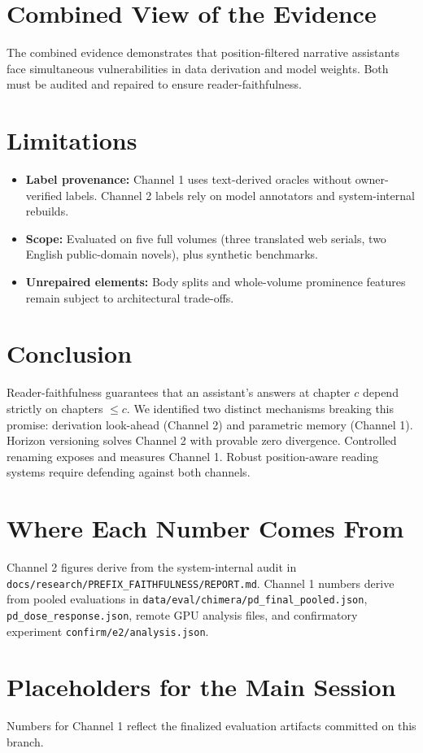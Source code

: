 \documentclass[11pt]{article}
\begin{document}
\section{Combined View of the Evidence}

The combined evidence demonstrates that position-filtered narrative assistants face simultaneous vulnerabilities in data derivation and model weights. Both must be audited and repaired to ensure reader-faithfulness.

\section{Limitations}

\begin{itemize}
    \item \textbf{Label provenance:} Channel 1 uses text-derived oracles without owner-verified labels. Channel 2 labels rely on model annotators and system-internal rebuilds.
    \item \textbf{Scope:} Evaluated on five full volumes (three translated web serials, two English public-domain novels), plus synthetic benchmarks.
    \item \textbf{Unrepaired elements:} Body splits and whole-volume prominence features remain subject to architectural trade-offs.
\end{itemize}

\section{Conclusion}

Reader-faithfulness guarantees that an assistant's answers at chapter $c$ depend strictly on chapters $\le c$. We identified two distinct mechanisms breaking this promise: derivation look-ahead (Channel 2) and parametric memory (Channel 1). Horizon versioning solves Channel 2 with provable zero divergence. Controlled renaming exposes and measures Channel 1. Robust position-aware reading systems require defending against both channels.

\appendix

\section{Where Each Number Comes From}
Channel 2 figures derive from the system-internal audit in \texttt{docs/research/PREFIX\_FAITHFULNESS/REPORT.md}. Channel 1 numbers derive from pooled evaluations in \texttt{data/eval/chimera/pd\_final\_pooled.json}, \texttt{pd\_dose\_response.json}, remote GPU analysis files, and confirmatory experiment \texttt{confirm/e2/analysis.json}.

\section{Placeholders for the Main Session}
Numbers for Channel 1 reflect the finalized evaluation artifacts committed on this branch.



\end{document}
